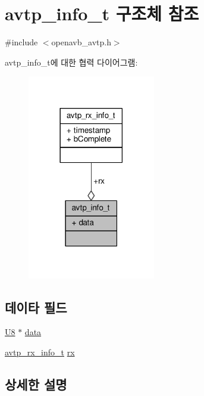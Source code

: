\hypertarget{structavtp__info__t}{}\section{avtp\+\_\+info\+\_\+t 구조체 참조}
\label{structavtp__info__t}


{\ttfamily \#include $<$openavb\+\_\+avtp.\+h$>$}



avtp\+\_\+info\+\_\+t에 대한 협력 다이어그램\+:
\nopagebreak
\begin{figure}[H]
\begin{center}
\leavevmode
\includegraphics[width=158pt]{structavtp__info__t__coll__graph}
\end{center}
\end{figure}
\subsection*{데이타 필드}
\begin{DoxyCompactItemize}
\item 
\hyperlink{openavb__types__base__pub_8h_aa63ef7b996d5487ce35a5a66601f3e73}{U8} $\ast$ \hyperlink{structavtp__info__t_af841be78d05c49dca097af1622b71c8e}{data}
\item 
\hyperlink{structavtp__rx__info__t}{avtp\+\_\+rx\+\_\+info\+\_\+t} \hyperlink{structavtp__info__t_abc1ad371e78eda623902e2d5e64f6afa}{rx}
\end{DoxyCompactItemize}


\subsection{상세한 설명}


